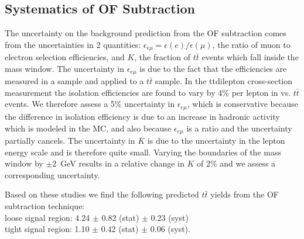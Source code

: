 
\subsection{Systematics of OF Subtraction}
\label{sec:systematicsof}

The uncertainty on the background prediction from the OF subtraction comes from the uncertainties in 2
quantities: $\epsilon_{e\mu} = \epsilon(e)/\epsilon(\mu)$, the ratio of muon to electron selection efficiencies,
and $K$, the fraction of $t\bar{t}$ events which fall inside the \Z mass window.
The uncertainty in $\epsilon_{e\mu}$ is due to the fact that the efficiencies are measured in a \Z sample and applied to
a $t\bar{t}$ sample. In the ttdilepton cross-section measurement the isolation efficiencies are found to
vary by 4\% per lepton in \Z vs. $t\bar{t}$ events. We therefore assess a 5\% uncertainty in $\epsilon_{e\mu}$, which
is conservative because the difference in isolation efficiency is due to an increase in hadronic activity
which is modeled in the MC, and also because $\epsilon_{e\mu}$ is a ratio and the uncertainty partially cancels.
The uncertainty in $K$ is due to the uncertainty in the lepton energy scale and is therefore quite small.
Varying the boundaries of the \Z mass window by $\pm2$~GeV results in a relative change in $K$ of 2\% 
and we assess a corresponding uncertainty.

Based on these studies we find the following predicted $t\bar{t}$ yields from the OF subtraction technique: \\
loose signal region:  4.24 $\pm$ 0.82 (stat) $\pm$ 0.23 (syst)  \\
tight signal region:  1.10 $\pm$ 0.42 (stat) $\pm$ 0.06 (syst).






%

